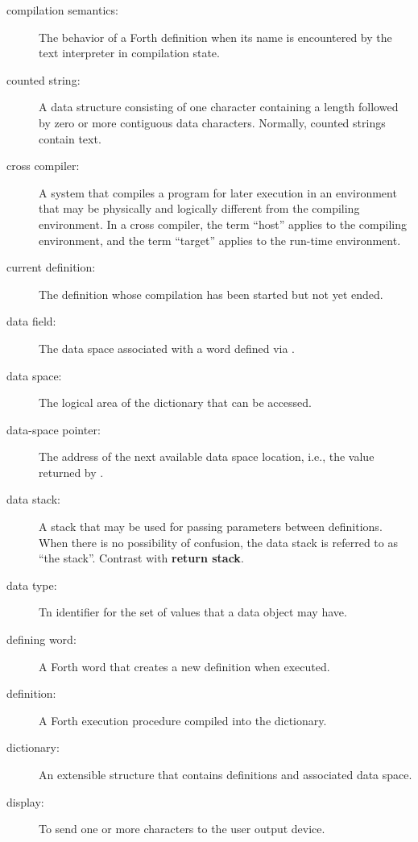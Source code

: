 \begin{description}
\item[compilation semantics:]
	The behavior of a Forth definition when its name is encountered
	by the text interpreter in compilation state.

\item[counted string:]
	A data structure consisting of one character containing a length
	followed by zero or more contiguous data characters. Normally,
	counted strings contain text.

\item[cross compiler:]
	A system that compiles a program for later execution in an
	environment that may be physically and logically different
	from the compiling environment. In a cross compiler, the term
	``host'' applies to the compiling environment, and the term
	``target'' applies to the run-time environment.

\item[current definition:]
	The definition whose compilation has been started but not yet ended.

\item[data field:]
	The data space associated with a word defined via .

\item[data space:]
	The logical area of the dictionary that can be accessed.

\item[data-space pointer:]
	The address of the next available data space location, i.e., the
	value returned by .

\item[data stack:]
	A stack that may be used for passing parameters between
	definitions. When there is no possibility of confusion, the
	data stack is referred to as ``the stack''. Contrast with
	\textbf{return stack}.

\item[data type:]
	Tn identifier for the set of values that a data object may have.

\item[defining word:]
	A Forth word that creates a new definition when executed.

\item[definition:]
	A Forth execution procedure compiled into the dictionary.

\item[dictionary:]
	An extensible structure that contains definitions and
	associated data space.

\item[display:]
	To send one or more characters to the user output device.


\end{description}
